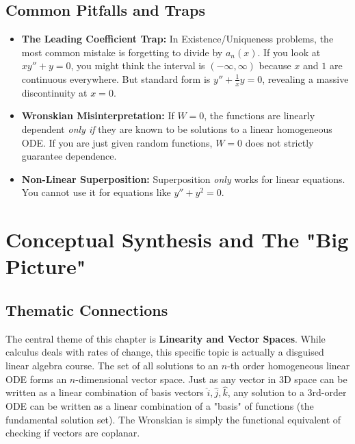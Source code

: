 \documentclass[11pt, a4paper]{article}
\theoremstyle{definition}
\theoremstyle{remark}
\begin{document}
\subsection{Common Pitfalls and Traps}
\begin{itemize}
    \item \textbf{The Leading Coefficient Trap:} In Existence/Uniqueness problems, the most common mistake is forgetting to divide by $a_n(x)$. If you look at $x y'' + y = 0$, you might think the interval is $(-\infty, \infty)$ because $x$ and $1$ are continuous everywhere. But standard form is $y'' + \frac{1}{x}y = 0$, revealing a massive discontinuity at $x=0$.
    \item \textbf{Wronskian Misinterpretation:} If $W = 0$, the functions are linearly dependent \textit{only if} they are known to be solutions to a linear homogeneous ODE. If you are just given random functions, $W=0$ does not strictly guarantee dependence.
    \item \textbf{Non-Linear Superposition:} Superposition \textit{only} works for linear equations. You cannot use it for equations like $y'' + y^2 = 0$.
\end{itemize}

\newpage
\section{Conceptual Synthesis and The "Big Picture"}

\subsection{Thematic Connections}
The central theme of this chapter is \textbf{Linearity and Vector Spaces}. While calculus deals with rates of change, this specific topic is actually a disguised linear algebra course. The set of all solutions to an $n$-th order homogeneous linear ODE forms an $n$-dimensional vector space. 
Just as any vector in 3D space can be written as a linear combination of basis vectors $\hat{i}, \hat{j}, \hat{k}$, any solution to a 3rd-order ODE can be written as a linear combination of a "basis" of functions (the fundamental solution set). The Wronskian is simply the functional equivalent of checking if vectors are coplanar.
\end{document}
